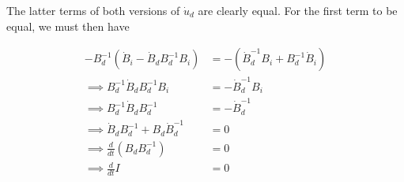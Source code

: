 \documentclass[letterpaper,11pt]{article}
\begin{document}
The latter terms of both versions of $\dot{u}_d$ are clearly equal.  For the
first term to be equal, we must then have

\begin{align}
-B_d^{-1} \left( \dot{B}_i - \dot{B}_d B_d^{-1} B_i \right) &=
-\left(\dot{B}_d^{-1} B_i + B_d^{-1} \dot{B}_i\right) \\
\implies B_d^{-1} \dot{B}_d B_d^{-1} B_i &= -\dot{B}_d^{-1} B_i\\
\implies B_d^{-1} \dot{B}_d B_d^{-1} &= -\dot{B}_d^{-1} \\
\implies \dot{B}_d B_d^{-1} + B_d \dot{B}_d^{-1} &= 0 \\
\implies \frac{d}{dt} \left(B_d B_d^{-1} \right) &= 0 \\
\implies \frac{d}{dt} I &= 0
\end{align}
\end{document}
